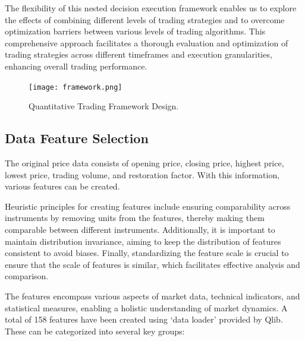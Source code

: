 \documentclass[conference]{IEEEtran}
\begin{document}
The flexibility of this nested decision execution framework enables us to explore the effects of combining different levels of trading strategies and to overcome optimization barriers between various levels of trading algorithms. This comprehensive approach facilitates a thorough evaluation and optimization of trading strategies across different timeframes and execution granularities, enhancing overall trading performance.

\begin{figure}[h]
    \centering
    \texttt{[image: framework.png]}
    \caption{Quantitative Trading Framework Design.}
    \label{fig:framework}
\end{figure}

\subsection{\textbf{Data Feature Selection}}

The original price data consists of opening price, closing price, highest price, lowest price, trading volume, and restoration factor. With this information, various features can be created.

Heuristic principles for creating features include ensuring comparability across instruments by removing units from the features, thereby making them comparable between different instruments. Additionally, it is important to maintain distribution invariance, aiming to keep the distribution of features consistent to avoid biases. Finally, standardizing the feature scale is crucial to ensure that the scale of features is similar, which facilitates effective analysis and comparison.

The features encompass various aspects of market data, technical indicators, and statistical measures, enabling a holistic understanding of market dynamics. A total of 158 features have been created using ‘data loader’ provided by Qlib. These can be categorized into several key groups:
\end{document}

